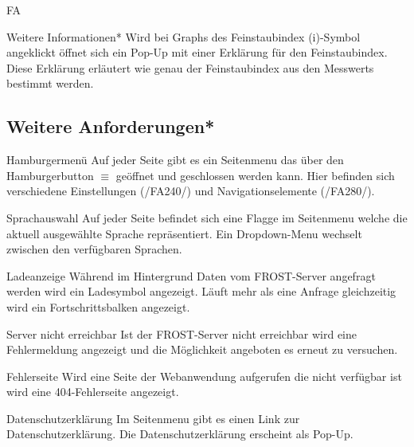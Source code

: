 \begin{Kriterien}{FA}
 \item[Weitere Informationen*]
   Wird bei \glspl{Graph} des \gls{Feinstaubindex} (i)-Symbol angeklickt öffnet sich ein \gls{Pop-Up} mit einer Erklärung für den \gls{Feinstaubindex}.
   Diese Erklärung erläutert wie genau der \gls{Feinstaubindex} aus den \glspl{Messwert} bestimmt werden.

\subsection{Weitere Anforderungen*}

 \item[Hamburgermenü]
  Auf jeder Seite gibt es ein \gls{Seitenmenu} das über den Hamburgerbutton $\equiv$ geöffnet und geschlossen werden kann.
  Hier befinden sich verschiedene Einstellungen (/FA240/) und Navigationselemente (/FA280/).

 \item[Sprachauswahl]
   Auf jeder Seite befindet sich eine Flagge im \gls{Seitenmenu} welche die aktuell ausgewählte Sprache repräsentiert.
   Ein \gls{Dropdown-Menu} wechselt zwischen den verfügbaren Sprachen.

 \item[Ladeanzeige]
  Während im Hintergrund Daten vom \gls{FROST-Server} angefragt werden wird ein Ladesymbol angezeigt.
  Läuft mehr als eine Anfrage gleichzeitig wird ein Fortschrittsbalken angezeigt.

 \item[Server nicht erreichbar]
  Ist der \gls{FROST-Server} nicht erreichbar wird eine Fehlermeldung angezeigt und die Möglichkeit angeboten es erneut zu versuchen.

 \item[Fehlerseite]
  Wird eine Seite der \gls{Webanwendung} aufgerufen die nicht verfügbar ist wird eine 404-Fehlerseite angezeigt.

 \item[Datenschutzerklärung]
  Im \gls{Seitenmenu} gibt es einen Link zur Datenschutzerklärung.
  Die Datenschutzerklärung erscheint als \gls{Pop-Up}.
\end{Kriterien}
